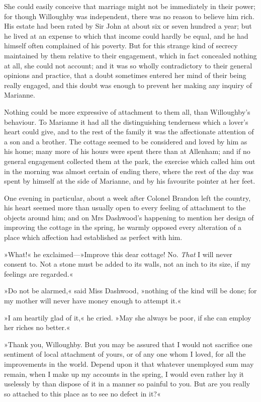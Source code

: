 She could easily conceive that marriage might not be immediately in their power; for though Willoughby was independent, there was no reason to believe him rich. His estate had been rated by Sir John at about six or seven hundred a year; but he lived at an expense to which that income could hardly be equal, and he had himself often complained of his poverty. But for this strange kind of secrecy maintained by them relative to their engagement, which in fact concealed nothing at all, she could not account; and it was so wholly contradictory to their general opinions and practice, that a doubt sometimes entered her mind of their being really engaged, and this doubt was enough to prevent her making any inquiry of Marianne.

Nothing could be more expressive of attachment to them all, than Willoughby’s behaviour. To Marianne it had all the distinguishing tenderness which a lover’s heart could give, and to the rest of the family it was the affectionate attention of a son and a brother. The cottage seemed to be considered and loved by him as his home; many more of his hours were spent there than at Allenham; and if no general engagement collected them at the park, the exercise which called him out in the morning was almost certain of ending there, where the rest of the day was spent by himself at the side of Marianne, and by his favourite pointer at her feet.

One evening in particular, about a week after Colonel Brandon left the country, his heart seemed more than usually open to every feeling of attachment to the objects around him; and on Mrs Dashwood’s happening to mention her design of improving the cottage in the spring, he warmly opposed every alteration of a place which affection had established as perfect with him.

»What!« he exclaimed—»Improve this dear cottage! No. \textit{That} I will never consent to. Not a stone must be added to its walls, not an inch to its size, if my feelings are regarded.«

»Do not be alarmed,« said Miss Dashwood, »nothing of the kind will be done; for my mother will never have money enough to attempt it.«

»I am heartily glad of it,« he cried. »May she always be poor, if she can employ her riches no better.«

»Thank you, Willoughby. But you may be assured that I would not sacrifice one sentiment of local attachment of yours, or of any one whom I loved, for all the improvements in the world. Depend upon it that whatever unemployed sum may remain, when I make up my accounts in the spring, I would even rather lay it uselessly by than dispose of it in a manner so painful to you. But are you really so attached to this place as to see no defect in it?«

